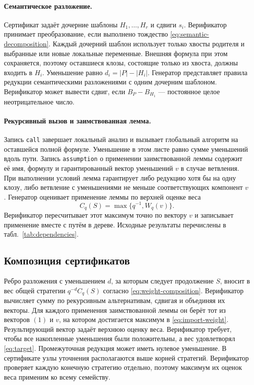 \documentclass[10pt,twoside]{article}
\theoremstyle{definition}
\theoremstyle{remark}
\begin{document}
\paragraph{Семантическое разложение.}
Сертификат задаёт дочерние шаблоны $H_1,\ldots,H_r$ и сдвиги $s_i$.
Верификатор принимает преобразование, если выполнено тождество
\eqref{eq:semantic-decomposition}. Каждый дочерний шаблон использует
только хвосты родителя и выбранные или новые локальные переменные.
Внешняя формула при этом сохраняется, поэтому оставшиеся клозы, состоящие
только из хвоста, должны входить в $H_i$. Уменьшение равно
$d_i=|P|-|H_i|$. Генератор представляет правила редукции семантическими
разложениями с одним дочерним шаблоном. Верификатор может вывести сдвиг,
если $B_P-B_{H_1}$ --- постоянное целое неотрицательное число.

\paragraph{Рекурсивный вызов и заимствованная лемма.}
Запись \texttt{call} завершает локальный анализ и вызывает глобальный
алгоритм на оставшейся полной формуле. Уменьшение в этом листе равно
сумме уменьшений вдоль пути. Запись \texttt{assumption} о применении
заимствованной леммы содержит её имя, формулу и гарантированный вектор
уменьшений $v$ в случае ветвления. При выполнении условий лемма
гарантирует либо редукцию хотя бы на одну клозу, либо ветвление с
уменьшениями не меньше соответствующих компонент $v$. Генератор
оценивает применение леммы по верхней оценке веса
\begin{equation}
 C_q(S)=\max\{q^{-1},W_q(v)\}.
 \label{eq:import-weight}
\end{equation}
Верификатор пересчитывает этот максимум точно по вектору $v$ и записывает
применение вместе с путём в дереве. Исходные результаты перечислены
в табл.~\ref{tab:dependencies}.

\subsection{Композиция сертификатов}
\label{sec:checker}

Ребро разложения с уменьшением $d$, за которым следует продолжение $S$,
вносит в вес общей стратегии $q^{-d}C_q(S)$ согласно
\eqref{eq:weight-composition}. Верификатор вычисляет сумму по
рекурсивным альтернативам, сдвигая и объединяя их векторы. Для каждого
применения заимствованной леммы он берёт тот из векторов $(1)$ и $v$,
на котором достигается максимум в \eqref{eq:import-weight}.
Результирующий вектор задаёт верхнюю оценку веса. Верификатор требует,
чтобы все накопленные уменьшения были положительны, а вес удовлетворял
\eqref{eq:target}. Промежуточная редукция может иметь нулевое
уменьшение. В сертификате узлы уточнения располагаются выше корней
стратегий. Верификатор проверяет каждую конечную стратегию отдельно,
поэтому максимум их оценок веса применим ко всему семейству.
\end{document}
